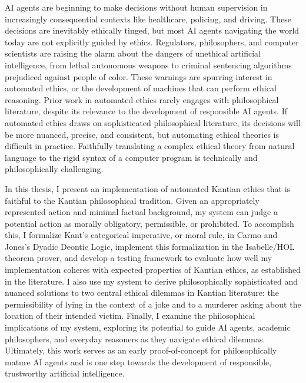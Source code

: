%
\begin{isabellebody}%
%
%
\isadelimtheory
%
\endisadelimtheory
%
\isatagtheory
%
\endisatagtheory
{\isafoldtheory}%
%
\isadelimtheory
%
\endisadelimtheory
%
\begin{isamarkuptext}%
AI agents are beginning to make decisions without human supervision in increasingly consequential 
contexts like healthcare, policing, and driving. These decisions are inevitably ethically tinged, 
but most AI agents navigating the world today are not explicitly guided by ethics.
Regulators, philosophers, and computer scientists are raising the alarm about the 
dangers of unethical artificial intelligence, from lethal autonomous weapons to criminal
sentencing algorithms prejudiced against people of color. These warnings are spurring interest in 
automated ethics, or the development of machines that can perform ethical reasoning. Prior work in 
automated ethics rarely engages with philosophical literature, despite its relevance to the 
development of responsible AI agents. If automated ethics draws on sophisticated philosophical
literature, its decisions will be more nuanced, precise, and consistent, but automating ethical theories is 
difficult in practice. Faithfully translating a complex ethical theory from natural language to the 
rigid syntax of a computer program is technically and philosophically challenging.

In this thesis, I present an implementation of automated Kantian
ethics that is faithful to the Kantian philosophical tradition. Given an appropriately represented 
action and minimal factual background, my system can judge a potential action as morally obligatory, permissible, or prohibited.
To accomplish this, I formalize Kant's categorical imperative, or moral rule,
in Carmo and Jones's Dyadic Deontic Logic, implement this formalization 
in the Isabelle/HOL theorem prover, and develop a testing framework to evaluate how well 
my implementation coheres with expected properties of Kantian ethics, as established in the literature. 
I also use my system to derive philosophically sophisticated and nuanced solutions to two central ethical 
dilemmas in Kantian literature: the permissibility of lying in the context of a joke and to a murderer 
asking about the location of their intended victim. Finally, I examine the philosophical implications 
of my system, exploring its potential to guide AI agents, academic philosophers, 
and everyday reasoners as they navigate ethical dilemmas. Ultimately, this work serves 
as an early proof-of-concept for philosophically mature AI agents and is one step towards the development 
of responsible, trustworthy artificial intelligence.%
\end{isamarkuptext}\isamarkuptrue%
%
\isadelimtheory
%
\endisadelimtheory
%
\isatagtheory
%
\endisatagtheory
{\isafoldtheory}%
%
\isadelimtheory
%
\endisadelimtheory
%
\end{isabellebody}%
